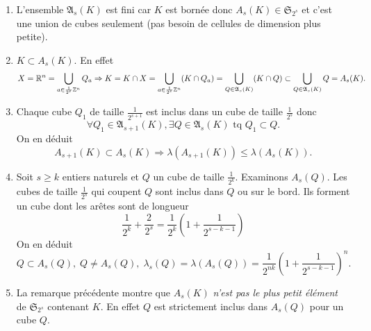 \begin{rems}
 \begin{enumerate}
  \item L'ensemble $\mathfrak{A}_s(K)$ est fini car $K$ est bornée donc $A_s(K) \in \mathfrak{S}_{2^s}$ et c'est une union de cubes seulement (pas besoin de cellules de dimension plus petite).
  \item $K \subset A_s(K)$. En effet
  \begin{displaymath}
    X = \mathbb{R}^n = \bigcup_{a\in \frac{1}{2^s}\mathbb{Z}^n}Q_a \Rightarrow K = K\cap X = \bigcup_{a\in \frac{1}{2^s}\mathbb{Z}^n}(K\cap Q_a)
      = \bigcup_{Q \in \mathfrak{A}_s(K)}(K \cap Q)
      \subset \bigcup_{Q \in \mathfrak{A}_s(K)} Q = A_s(K).
\end{displaymath}

  \item Chaque cube $Q_1$ de taille $\frac{1}{2^{s+1}}$ est inclus dans un cube de taille $\frac{1}{2^s}$ donc
  \begin{displaymath}
   \forall Q_1 \in \mathfrak{A}_{s+1}(K), \exists Q \in \mathfrak{A}_{s}(K) \text{ tq } Q_1 \subset Q.
  \end{displaymath}
On en déduit
\begin{displaymath}
 A_{s+1}(K) \subset A_s(K) \Rightarrow \lambda(A_{s+1}(K)) \leq \lambda(A_s(K)) .
\end{displaymath}
  \item Soit $s \geq k$ entiers naturels et $Q$ un cube de taille $\frac{1}{2^k}$. Examinons $A_s(Q)$.\newline
  Les cubes de taille $\frac{1}{2^s}$ qui coupent $Q$ sont inclus dans $Q$ ou sur le bord. Ils forment un cube dont les arêtes sont de longueur
  \begin{displaymath}
    \frac{1}{2^k} + \frac{2}{2^s} = \frac{1}{2^k}\left( 1 + \frac{1}{2^{s-k-1}} \right)
  \end{displaymath}
  On en déduit
  \begin{displaymath}
   Q \subset A_s(Q), \; Q \neq A_s(Q), \; \lambda_s(Q) = \lambda(A_s(Q)) =  \frac{1}{2^{nk}}(1 + \frac{1}{2^{s-k-1}})^n.
  \end{displaymath}
  \item La remarque précédente montre que $A_s(K)$ \emph{n'est pas le plus petit élément } de $\mathfrak{S}_{2^s}$ contenant $K$. En effet $Q$ est strictement inclus dans $A_s(Q)$ pour un cube $Q$.
 \end{enumerate}
\end{rems}

